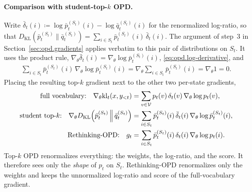 \paragraph{Comparison with student-top-$k$ OPD.}
Write $\bar\delta_t(i)\coloneqq\log\bar p_t^{(S_t)}(i)-\log\bar q_t^{(S_t)}(i)$ for the
renormalized log-ratio, so that
$D_{\mathrm{KL}}(\bar p_t^{(S_t)}\|\bar q_t^{(S_t)})=\sum_{i\in S_t}\bar p_t^{(S_t)}(i)\,\bar\delta_t(i)$.
The argument of step~3 in Section~\ref{sec:opd.gradients} applies verbatim to this pair of
distributions on $S_t$. It uses the product rule,
$\nabla_\theta\bar\delta_t(i)=\nabla_\theta\log\bar p_t^{(S_t)}(i)$,
\eqref{eq:opd.log-derivative}, and
\begin{align*}
    \sum_{i\in S_t}\bar p_t^{(S_t)}(i)\,\nabla_\theta\log\bar p_t^{(S_t)}(i)
    =
    \nabla_\theta\sum_{i\in S_t}\bar p_t^{(S_t)}(i)
    =
    \nabla_\theta 1
    =
    0.
\end{align*}
Placing the resulting top-$k$ gradient next to the other two per-state gradients,
\begin{align}
    \text{full vocabulary:}\quad
    \nabla_\theta\mathrm{kl}_t(x,y_{<t})
    &=
    \sum_{v\in{\cal V}}p_t(v)\,\delta_t(v)\,\nabla_\theta\log p_t(v),
    \nonumber\\
    \text{student top-}k\text{:}\quad
    \nabla_\theta D_{\mathrm{KL}}\!\left(\bar p_t^{(S_t)}\,\middle\|\,\bar q_t^{(S_t)}\right)
    &=
    \sum_{i\in S_t}\bar p_t^{(S_t)}(i)\,\bar\delta_t(i)\,\nabla_\theta\log\bar p_t^{(S_t)}(i),
    \label{eq:opd.top-k-grad}\\
    \text{Rethinking-OPD:}\quad
    g_t
    &=
    \sum_{i\in S_t}\bar p_t^{(S_t)}(i)\,\delta_t(i)\,\nabla_\theta\log p_t(i).
    \nonumber
\end{align}
Top-$k$ OPD renormalizes everything: the weights, the log-ratio, and the score. It therefore
sees only the \emph{shape} of $p_t$ on $S_t$. Rethinking-OPD renormalizes only the weights and
keeps the unnormalized log-ratio and score of the full-vocabulary gradient.

